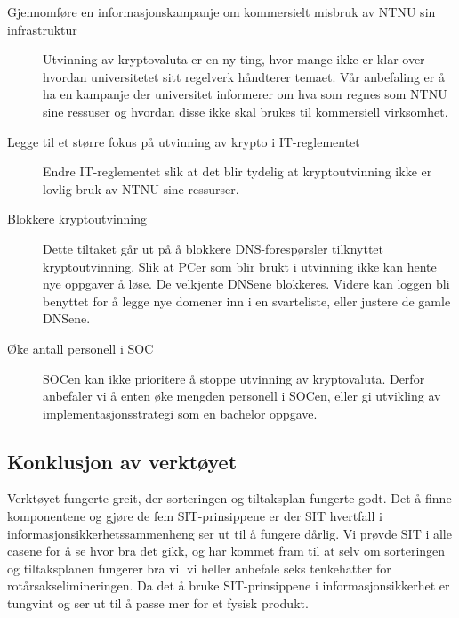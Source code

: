 \begin{description}
    \item[Gjennomføre en informasjonskampanje om kommersielt misbruk av NTNU sin infrastruktur] Utvinning av kryptovaluta er en ny ting, hvor mange ikke er klar over hvordan universitetet sitt regelverk håndterer temaet. Vår anbefaling er å ha en kampanje der universitet informerer om hva som regnes som NTNU sine ressuser og hvordan disse ikke skal brukes til kommersiell virksomhet.
    \item[Legge til et større fokus på utvinning av krypto i IT-reglementet] Endre IT-reglementet slik at det blir tydelig at kryptoutvinning ikke er lovlig bruk av NTNU sine ressurser. 
    \item[Blokkere kryptoutvinning] Dette tiltaket går ut på å blokkere DNS-forespørsler tilknyttet kryptoutvinning. Slik at PCer som blir brukt i utvinning ikke kan hente nye oppgaver å løse. De velkjente DNSene blokkeres. Videre kan loggen bli benyttet for å legge nye domener inn i en svarteliste, eller justere de gamle DNSene.
    \item[Øke antall personell i SOC] SOCen kan ikke prioritere å stoppe utvinning av kryptovaluta. Derfor anbefaler vi å enten øke mengden personell i SOCen, eller gi utvikling av implementasjonsstrategi som en bachelor oppgave.
\end{description}


\subsection{Konklusjon av verktøyet}
 Verktøyet fungerte greit, der sorteringen og tiltaksplan fungerte godt. Det å finne komponentene og gjøre de fem SIT-prinsippene er der SIT hvertfall i informasjonsikkerhetssammenheng  ser ut til å fungere dårlig. Vi prøvde SIT i alle casene for å se hvor bra det gikk, og har kommet fram til at selv om sorteringen og tiltaksplanen fungerer bra vil vi heller anbefale seks tenkehatter for rotårsakselimineringen. Da det å bruke SIT-prinsippene i informasjonsikkerhet er tungvint og ser ut til å passe mer for et fysisk produkt. 